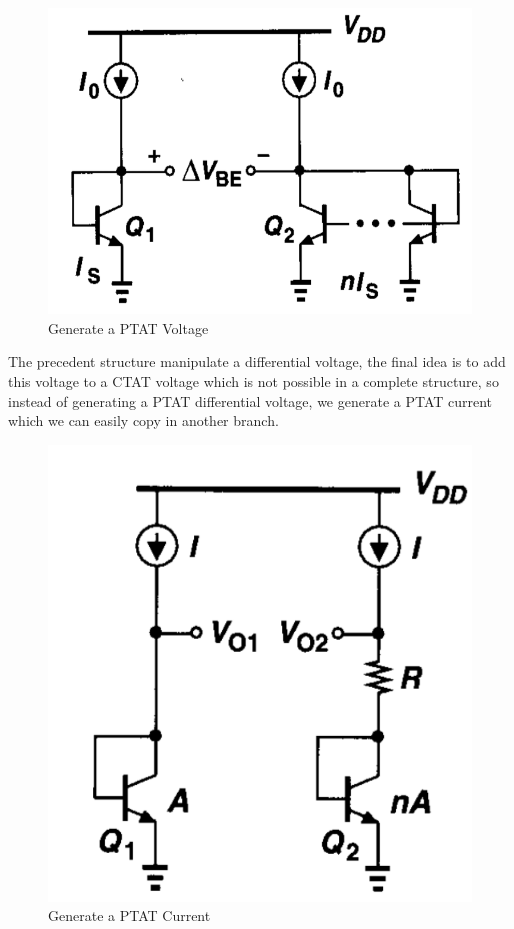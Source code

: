 \documentclass[11pt,a4paper]{report}
\begin{document}
\begin{figure}[h]
  \begin{center}
    \includegraphics[scale=0.35]{photo/PTAT_1}
  \end{center}
  \caption{Generate a PTAT Voltage}
  \label{PTAT_1}
\end{figure}

\newpage

The precedent structure manipulate a differential voltage, the final idea is to add this voltage to a CTAT voltage which is not possible in a complete structure, so instead of generating a PTAT differential voltage, we generate a PTAT current which we can easily copy in another branch.

\begin{figure}[h]
  \begin{center}
    \includegraphics[scale=0.35]{photo/PTAT2}
  \end{center}
  \caption{Generate a PTAT Current}
  \label{PTAT_Cur}
\end{figure}
\end{document}
